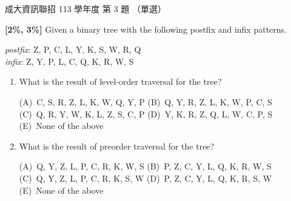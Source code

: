 \begin{pastexam}[label={px:ncku-113-prog-03}]{成大資訊聯招 113 學年度 第 3 題}
（單選）

\textbf{[2\%, 3\%]} Given a binary tree with the following postfix and infix patterns.
\begin{center}
\textit{postfix}: Z, P, C, L, Y, K, S, W, R, Q\\
\textit{infix}: Z, Y, P, L, C, Q, K, R, W, S
\end{center}
\begin{enumerate}[label=\roman*)]
\item What is the result of level-order traversal for the tree?

(A)~C, S, R, Z, L, K, W, Q, Y, P \qquad (B)~Q, Y, R, Z, L, K, W, P, C, S\\
(C)~Q, R, Y, W, K, L, Z, S, C, P \qquad (D)~Y, K, R, Z, Q, L, W, C, P, S\\
(E)~None of the above
\item What is the result of preorder traversal for the tree?

(A)~Q, Y, Z, L, P, C, R, K, W, S \qquad (B)~P, Z, C, Y, L, Q, K, R, W, S\\
(C)~Q, Y, Z, L, P, C, R, K, S, W \qquad (D)~P, Z, C, Y, L, Q, K, R, S, W\\
(E)~None of the above
\end{enumerate}
\end{pastexam}

